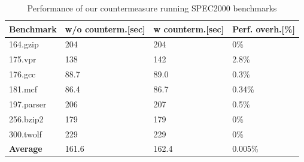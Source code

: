 \begin{table}%
\addtolength{\belowcaptionskip}{-3mm}
\begin{center}
\begin{tabular}{|l|l|l|l|}
\hline
\bf{Benchmark} & \bf{w/o counterm.}[sec] & \bf{w counterm.}[sec] & \bf{Perf. overh.}[\%] \\
\hline
164.gzip & 204 &  204 &  0\% \\
\hline
175.vpr  &  138 & 142 &  2.8\%\\
\hline
176.gcc  & 88.7 & 89.0 &  0.3\% \\
\hline
181.mcf   & 86.4 & 86.7 & 0.34\%  \\
\hline
197.parser & 206 & 207 & 0.5\% \\
\hline
256.bzip2  & 179  &  179 & 0\% \\
\hline
300.twolf  & 229 & 229 &  0\% \\
\hline
\textbf{Average} & 161.6 & 162.4 & 0.005\%\\
\hline
\end{tabular}
\end{center}
\caption{{Performance of our countermeasure running SPEC2000 benchmarks}}
\label{specbench}
\end{table}

